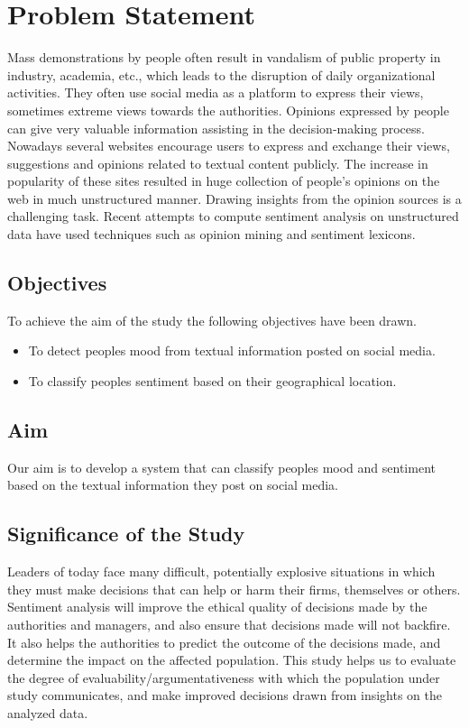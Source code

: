 

\chapter{Problem Statement}


Mass demonstrations by people often result in vandalism of public property in industry, academia, etc., which leads to the disruption of daily organizational activities.
They often use social media as a platform to express their views, sometimes extreme views towards the authorities. Opinions expressed by people can give very valuable information assisting in the decision-making process. Nowadays several websites encourage users to express and exchange their views, suggestions and opinions related to textual content publicly. The increase in popularity of these sites resulted in huge collection of people's opinions on the web in much unstructured manner. Drawing insights from the opinion sources is a challenging task. Recent attempts to compute sentiment analysis on unstructured data have used techniques such as opinion mining and sentiment lexicons.


\section{Objectives}
To achieve the aim of the study the following objectives have been drawn. 
\begin{itemize}
\item To detect people\textquotesingle s mood from textual information posted on social media.
\item To classify people\textquotesingle s sentiment based on their geographical location.
\end{itemize}

\section{Aim}

Our aim is to develop a system that can classify people\textquotesingle s mood and sentiment based on the textual information they post on social media.



\section{Significance of the Study}
Leaders of today face many difficult, potentially explosive situations in which they must make decisions that can help or harm their firms, themselves or others. Sentiment analysis will improve the ethical quality of decisions made by the authorities and managers, and also ensure that decisions made will not backfire. It also helps the authorities to predict the outcome of the decisions made, and determine the impact on the affected population. This study helps us to evaluate the degree of evaluability/argumentativeness with which the population under study communicates, and make improved decisions drawn from insights on the analyzed data.



